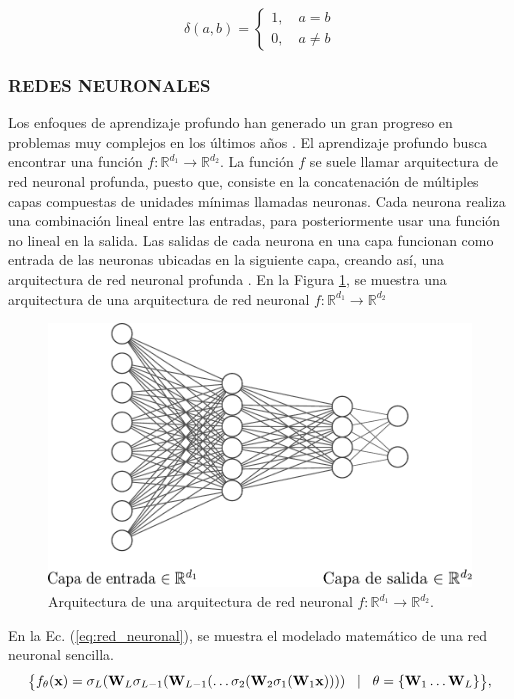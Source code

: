 \begin{equation}
    \delta(a,b) = \begin{cases}
        1, \quad a = b \\
        0, \quad a \neq b
    \end{cases}
\end{equation}
\subsubsection{REDES NEURONALES}

Los enfoques de aprendizaje profundo han generado un gran progreso en problemas muy complejos en los últimos años
\cite{he2016deep,li2019deep,li2018deep, wang2019development,vaswani2017attention}. El aprendizaje profundo busca encontrar una función $f: \mathbb{R}^{d_1} \rightarrow \mathbb{R}^{d_2}$. La función $f$ se suele llamar arquitectura de red neuronal profunda, puesto que, consiste en la concatenación de múltiples capas compuestas de unidades mínimas llamadas neuronas. Cada neurona realiza una combinación lineal entre las entradas, para posteriormente usar una función no lineal en la salida. Las salidas de cada neurona en una capa funcionan como entrada de las neuronas ubicadas en la siguiente capa, creando así, una arquitectura de red neuronal profunda \cite{fan2019selective}. En la Figura \ref{fig:nn}, se muestra una arquitectura de una arquitectura de red neuronal $f: \mathbb{R}^{d_1} \rightarrow \mathbb{R}^{d_2}$

\begin{figure}[H]
    \centering
    \includegraphics[width=0.6\linewidth]{images/nn.pdf}
    \caption{\hspace{2mm}Arquitectura de una arquitectura de red neuronal $f: \mathbb{R}^{d_1} \rightarrow \mathbb{R}^{d_2}$.}
    \label{fig:nn}
\end{figure}

En la Ec. (\ref{eq:red_neuronal}), se muestra el modelado matemático de una red neuronal sencilla. 
\begin{equation}
    \footnotesize 
    \big\{f_\theta(\mathbf{x}) = \sigma_{L}(\mathbf{W}_{L}\sigma_{L-1}(\mathbf{W}_{L-1} (\dots \sigma_2(\mathbf{W}_2\sigma_1(\mathbf{W}_1\mathbf{x})))) \quad \vert \quad\theta = \{\mathbf{W}_{1} \dots \mathbf{W}_{L}\}  \big\},
    \label{eq:red_neuronal}
\end{equation}

